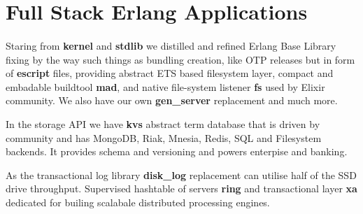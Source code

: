 \documentclass[11pt]{article}
\begin{document}


\section*{Full Stack Erlang Applications}
\paragraph{}

Staring from {\bf kernel} and {\bf stdlib} we distilled and refined Erlang Base Library
fixing by the way such things as bundling creation, like OTP releases
but in form of {\bf escript} files, providing abstract ETS based filesystem layer,
compact and embadable buildtool {\bf mad}, and native file-system listener {\bf fs}
used by Elixir community. We also have our own {\bf gen_server} replacement and much more.

In the storage API we have {\bf kvs} abstract term database that is driven by community and
has MongoDB, Riak, Mnesia, Redis, SQL and Filesystem backends. It provides schema and
versioning and powers enterpise and banking.

As the transactional log library {\bf disk_log}
replacement can utilise half of the SSD drive throughput.
Supervised hashtable of servers {\bf ring} and transactional layer {\bf xa} dedicated
for builing scalabale distributed processing engines.



\end{document}
